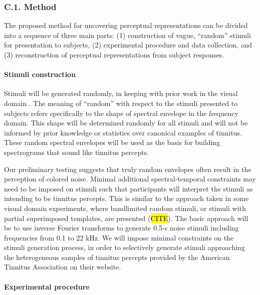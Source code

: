 \documentclass[11pt, notitlepage]{article} %
\begin{document}
\subsubsection*{C.1. Method}

The proposed method for uncovering perceptual representations can be divided
into a sequence of three main parts:
(1) construction of vague, ``random'' stimuli for presentation to subjects,
(2) experimental procedure and data collection,
and (3) reconstruction of perceptual representations from subject responses.


\paragraph{Stimuli construction}

Stimuli will be generated randomly, in keeping with prior work in the visual domain
\cite{gosselinSuperstitiousPerceptionsReveal2003}.
The meaning of ``random'' with respect to the stimuli presented to subjects
refers specifically to the shape of spectral envelope in the frequency domain.
This shape will be determined randomly for all stimuli
and will not be informed by prior knowledge
or statistics over canonical examples of tinnitus.
These random spectral envelopes will be used as the basis for building spectrograms
that sound like tinnitus percepts.

Our preliminary testing suggests that truly random envelopes
often result in the perception of colored noise.
Minimal additional spectral-temporal constraints may need to be imposed on stimuli
such that participants will interpret the stimuli as intending to be tinnitus percepts.
This is similar to the approach taken in some visual domain experiments,
where bandlimited random stimuli, or stimuli with partial superimposed templates,
are presented \cite{smithMeasuringInternalRepresentations2012} (\hl{CITE}).
The basic approach will be to use inverse Fourier transforms to generate 0.5-s noise stimuli
including frequencies from 0.1 to 22 kHz.
We will impose minimal constraints on the stimuli generation process,
in order to selectively generate stimuli approaching the heterogeneous samples of tinnitus percepts
provided by the American Tinnitus Association on their website.

\paragraph{Experimental procedure}
\end{document}
